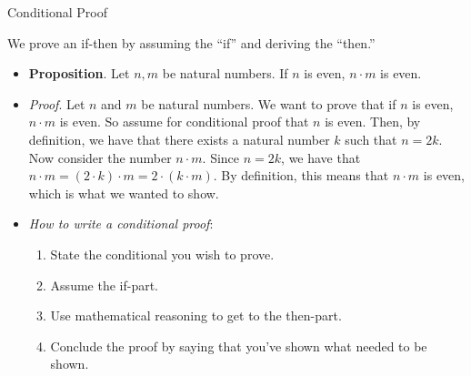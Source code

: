 \begin{frame}{Conditional Proof}

We prove an if-then by assuming the ``if'' and deriving the ``then.''
		
		\begin{itemize}
		
		\item \textbf{Proposition}. Let $n,m$ be natural numbers. If $n$ is even, $n\cdot m$ is even.
			\item \emph{Proof}. Let $n$ and $m$ be natural numbers. We want to prove that if $n$ is even, $n\cdot m$ is even. So assume for conditional proof that $n$ is even. Then, by definition, we have that there exists a natural number $k$ such that $n=2k$. Now consider the number $n\cdot m$. Since $n=2k$, we have that $n \cdot m=(2\cdot k)\cdot m=2\cdot (k\cdot m)$. By definition, this means that $n\cdot m$ is even, which is what we wanted to show.
	
	\item \emph{How to write a conditional proof}:
			
				\begin{enumerate}[1.]
				
					\item State the conditional you wish to prove.					
					\item Assume the if-part. 
					
					\item Use mathematical reasoning to get to the then-part.
					
					\item Conclude the proof by saying that you've shown what needed to be shown.
								
				\end{enumerate}
				
		\end{itemize}

\end{frame}


